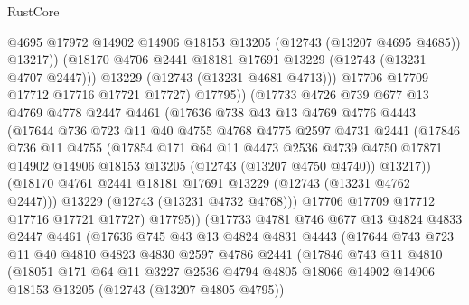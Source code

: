 \begin{lexlean}{RustCore}
\begin{coremodule}
                    @4695
                    @17972
                    @14902
                    @14906
                    @18153
                    @13205
                    (@12743 (@13207 @4695 @4685))
                    @13217))
                (@18170 @4706 @2441 @18181 @17691 @13229 (@12743 (@13231 @4707 @2447)))
                @13229
                (@12743 (@13231 @4681 @4713)))
              @17706
              @17709
              @17712
              @17716
              @17721
              @17727)
            @17795))
        (@17733
          @4726
          @739
          @677
          @13
          @4769
          @4778
          @2447
          @4461
          (@17636
            @738
            @43
            @13
            @4769
            @4776
            @4443
            (@17644
              @736
              @723
              @11
              @40
              @4755
              @4768
              @4775
              @2597
              @4731
              @2441
              (@17846
                @736
                @11
                @4755
                (@17854
                  @171
                  @64
                  @11
                  @4473
                  @2536
                  @4739
                  @4750
                  @17871
                  @14902
                  @14906
                  @18153
                  @13205
                  (@12743 (@13207 @4750 @4740))
                  @13217))
              (@18170 @4761 @2441 @18181 @17691 @13229 (@12743 (@13231 @4762 @2447)))
              @13229
              (@12743 (@13231 @4732 @4768)))
            @17706
            @17709
            @17712
            @17716
            @17721
            @17727)
          @17795))
      (@17733
        @4781
        @746
        @677
        @13
        @4824
        @4833
        @2447
        @4461
        (@17636
          @745
          @43
          @13
          @4824
          @4831
          @4443
          (@17644
            @743
            @723
            @11
            @40
            @4810
            @4823
            @4830
            @2597
            @4786
            @2441
            (@17846
              @743
              @11
              @4810
              (@18051
                @171
                @64
                @11
                @3227
                @2536
                @4794
                @4805
                @18066
                @14902
                @14906
                @18153
                @13205
                (@12743 (@13207 @4805 @4795))

\end{coremodule}
\end{lexlean}
